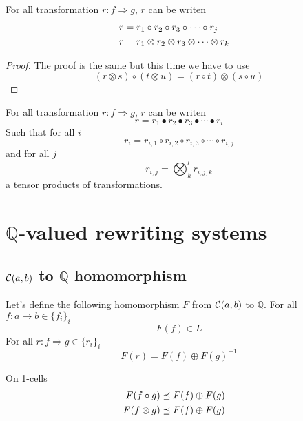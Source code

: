 \documentclass[a4paper]{article}
\begin{document}
\begin{proposition}
For all transformation $r: f \Rightarrow g$, $r$ can be writen
\begin{align}
r &= r_1 \circ r_2 \circ r_3 \circ \cdots \circ r_j \cr
r &= r_1 \otimes r_2 \otimes r_3 \otimes \cdots \otimes r_k
\end{align}

\begin{proof}
The proof is the same but this time we have to use
\[
(r \otimes s) \circ (t \otimes u) = (r \circ t) \otimes (s \circ u)
\]
\end{proof}
\end{proposition}

\begin{corollary}
For all transformation $r: f \Rightarrow g$, $r$ can be writen
\[
r = r_1 \bullet r_2 \bullet r_3 \bullet \cdots \bullet r_i
\]
Such that for all $i$
\[
r_i = r_{i, 1} \circ r_{i, 2} \circ r_{i, 3} \circ \cdots \circ r_{i, j}
\]
and for all $j$
\[
r_{i, j} = \bigotimes_k^l r_{i, j, k}
\]
a tensor products of transformations.
\end{corollary}


\section{$\mathbb{Q}$-valued rewriting systems}

\subsection{${\cal C}(a, b)$ to $\mathbb{Q}$ homomorphism}

Let's define the following homomorphism $F$ from ${\cal C}(a, b)$ to $\mathbb{Q}$. For all $f: a \to b \in \{f_i\}_i$
\[
F(f) \in L
\]
For all $r: f \Rightarrow g \in \{r_i\}_i$
\[
F(r) = F(f) \oplus F(g)^{-1}
\]

On 1-cells
\begin{align}
F(f \circ g) &\preceq F(f) \oplus F(g) \cr
F(f \otimes g) &\preceq F(f) \oplus F(g)
\end{align}
\end{document}
